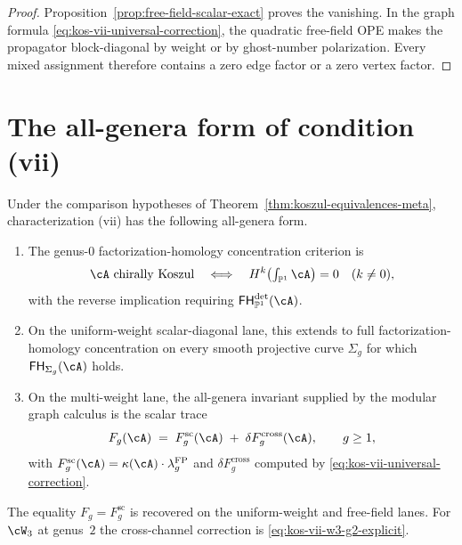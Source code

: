 \begin{proof}
Proposition~\textup{\ref{prop:free-field-scalar-exact}} proves the
vanishing. In the graph formula
\textup{\ref{eq:kos-vii-universal-correction}}, the quadratic
free-field OPE makes the propagator block-diagonal by weight or by
ghost-number polarization. Every mixed assignment therefore contains
a zero edge factor or a zero vertex factor.
\end{proof}

\section{The all-genera form of condition \textup{(vii)}}
\label{sec:kos-vii-upgrade}

\begin{theorem}
\label{thm:koszulness-vii-upgrade}
Under the comparison hypotheses of
Theorem~\textup{\ref{thm:koszul-equivalences-meta}}, characterization
\textup{(vii)} has the following all-genera form.
\begin{enumerate}[label=\textup{(\roman*)}]
\item The genus-$0$ factorization-homology concentration criterion is
\[
\cA\ \textup{chirally Koszul}
\quad\Longleftrightarrow\quad
H^k\!\left(\textstyle\int_{\mathbb{P}^1}\cA\right)=0
\quad(k\neq 0),
\]
with the reverse implication requiring
$\mathsf{FH}^{\mathrm{det}}_{\mathbb{P}^1}(\cA)$.
\item On the uniform-weight scalar-diagonal lane, this extends to full
factorization-homology concentration on every smooth projective curve
$\Sigma_g$ for which $\mathsf{FH}_{\Sigma_g}(\cA)$ holds.
\item On the multi-weight lane, the all-genera invariant supplied by
the modular graph calculus is the scalar trace
\[
F_g(\cA)
\;=\;
F_g^{\mathrm{sc}}(\cA)
\;+\;
\delta F_g^{\mathrm{cross}}(\cA),
\qquad g\geq 1,
\]
with
$F_g^{\mathrm{sc}}(\cA)=\kappa(\cA)\cdot\lambda_g^{\mathrm{FP}}$ and
$\delta F_g^{\mathrm{cross}}$ computed by
\textup{\ref{eq:kos-vii-universal-correction}}.
\end{enumerate}
The equality $F_g=F_g^{\mathrm{sc}}$ is recovered on the
uniform-weight and free-field lanes. For $\cW_3$ at genus~$2$ the
cross-channel correction is \textup{\ref{eq:kos-vii-w3-g2-explicit}}.
\end{theorem}

